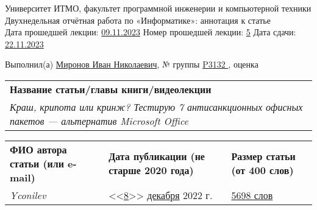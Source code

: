 \documentclass[12pt]{article}
\begin{document}
\begin{center}
\quad Университет ИТМО, факультет программной инженерии и компьютерной техники \\
\quad Двухнедельная отчётная работа по «Информатике»: аннотация к статье\\
\quad Дата прошедшей лекции: \underline{09.11.2023} 	Номер прошедшей лекции: \underline{5}	Дата сдачи: \underline{22.11.2023}

\bigskip

\quad Выполнил(а) \underline{Миронов Иван Николаевич}, № группы \underline{ P3132 }, оценка \underline{\hspace{2cm}}


\end{center}

\begin{tabularx}{\textwidth} { 
  | >{\raggedright\arraybackslash}X|}
    \hline
\textbf{Название статьи/главы книги/видеолекции}\\
    \textit{Краш, крипота или кринж? Тестирую 7 антисанкционных офисных пакетов — альтернатив Microsoft Office}\\
    \hline
\end{tabularx}

\begin{tabularx}{\textwidth} 
{ 
| >{\centering\arraybackslash}X
| >{\centering\arraybackslash}X
| >{\centering\arraybackslash}X 
|}
    \textbf{ФИО автора статьи \quad (или e-mail)} & \textbf{Дата публикации \qquad\qquad (не старше 2020 года)} & \textbf{Размер статьи \qquad\qquad (от 400 слов)} \\
     \textit{Yconilev} & <<\underline{8}>> \underline{декабря} 2022 г. & \underline{5698 слов} \\
    \hline
\end{tabularx}
\end{document}
